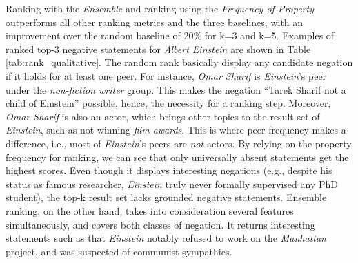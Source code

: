  Ranking with the \textit{Ensemble} and ranking using the \textit{Frequency of Property} outperforms all other ranking metrics and the three baselines, with an improvement over the random baseline of 20\% for k=3 and k=5. Examples of ranked top-3 negative statements for \textit{Albert Einstein} are shown in Table \ref{tab:rank_qualitative}. The random rank basically display any candidate negation if it holds for at least one peer. For instance, \textit{Omar Sharif} is \textit{Einstein}'s peer under the \textit{non-fiction writer} group. This makes the negation ``Tarek Sharif not a child of Einstein'' possible, hence, the necessity for a ranking step. Moreover, \textit{Omar Sharif} is also an actor, which brings other topics to the result set of \textit{Einstein}, such as not winning \textit{film awards}. This is where peer frequency makes a difference, i.e., most of \textit{Einstein}'s peers are \textit{not} actors. By relying on the property frequency for ranking, we can see that only universally absent statements get the highest scores. Even though it displays interesting negations (e.g., despite his status as famous researcher, \textit{Einstein} truly never formally supervised any PhD student), the top-k result set lacks grounded negative statements. Ensemble ranking, on the other hand, takes into consideration several features simultaneously, and covers both classes of negation. It returns interesting statements such as that \textit{Einstein} notably refused to work on the \textit{Manhattan} project, and was suspected of communist sympathies. 
 

\begin{table*}
  \caption{Top-3 results for \textit{Albert Einstein} using 3 ranking metrics.}
  \label{tab:rank_qualitative}
  \centering 
  \label{tbl:may:einstein}
\end{table*}


